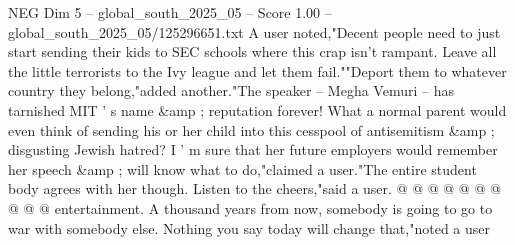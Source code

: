 \begin{textsample}{NEG Dim 5 – global\_south\_2025\_05 – Score 1.00 – global\_south\_2025\_05/125296651.txt}
A user noted,"Decent people need to just start sending their kids to SEC schools where this crap isn't rampant.
Leave all the little terrorists to the Ivy league and let them fail.""Deport them to whatever country they belong,"added another."The speaker -- Megha Vemuri -- has tarnished MIT ' s name \&amp ; reputation forever!
What a normal parent would even think of sending his or her child into this cesspool of antisemitism \&amp ; disgusting Jewish hatred?
I ' m sure that her future employers would remember her speech \&amp ; will know what to do,"claimed a user."The entire student body agrees with her though.
Listen to the cheers,"said a user. @ @ @ @ @ @ @ @ @ @ entertainment.
A thousand years from now, somebody is going to go to war with somebody else.
Nothing you say today will change that,"noted a user

\end{textsample}
